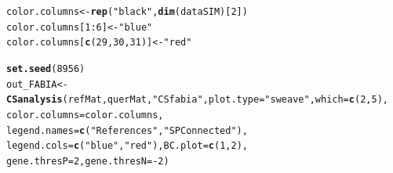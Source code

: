 \documentclass[a4paper]{article}\usepackage[]{graphicx}\usepackage[]{color}
\makeatletter
\newcommand{\hlnum}[1]{\textcolor[rgb]{0.686,0.059,0.569}{#1}}%
\newcommand{\hlstr}[1]{\textcolor[rgb]{0.192,0.494,0.8}{#1}}%
\newcommand{\hlopt}[1]{\textcolor[rgb]{0,0,0}{#1}}%
\newcommand{\hlstd}[1]{\textcolor[rgb]{0.345,0.345,0.345}{#1}}%
\newcommand{\hlkwb}[1]{\textcolor[rgb]{0.69,0.353,0.396}{#1}}%
\newcommand{\hlkwc}[1]{\textcolor[rgb]{0.333,0.667,0.333}{#1}}%
\newcommand{\hlkwd}[1]{\textcolor[rgb]{0.737,0.353,0.396}{\textbf{#1}}}%
\newenvironment{kframe}{%
 \def\at@end@of@kframe{}%
 \ifinner\ifhmode%
  \def\at@end@of@kframe{\end{minipage}}%
  \begin{minipage}{\columnwidth}%
 \fi\fi%
 \def\FrameCommand##1{\hskip\@totalleftmargin \hskip-\fboxsep
 \colorbox{shadecolor}{##1}\hskip-\fboxsep
     \hskip-\linewidth \hskip-\@totalleftmargin \hskip\columnwidth}%
 \MakeFramed {\advance\hsize-\width
   \@totalleftmargin\z@ \linewidth\hsize
   \@setminipage}}%
 {\par\unskip\endMakeFramed%
 \at@end@of@kframe}
\newenvironment{knitrout}{}{} %
\makeatother
\begin{document}
\begin{knitrout}
\color{fgcolor}\begin{kframe}
\begin{alltt}
        \hlstd{color.columns} \hlkwb{<-} \hlkwd{rep}\hlstd{(}\hlstr{"black"}\hlstd{,}\hlkwd{dim}\hlstd{(dataSIM)[}\hlnum{2}\hlstd{])}
        \hlstd{color.columns[}\hlnum{1}\hlopt{:}\hlnum{6}\hlstd{]} \hlkwb{<-} \hlstr{"blue"}
        \hlstd{color.columns[}\hlkwd{c}\hlstd{(}\hlnum{29}\hlstd{,}\hlnum{30}\hlstd{,}\hlnum{31}\hlstd{)]} \hlkwb{<-} \hlstr{"red"}

        \hlkwd{set.seed}\hlstd{(}\hlnum{8956}\hlstd{)}
        \hlstd{out_FABIA} \hlkwb{<-} \hlkwd{CSanalysis}\hlstd{(refMat,querMat,}\hlstr{"CSfabia"}\hlstd{,}\hlkwc{plot.type}\hlstd{=}\hlstr{"sweave"}\hlstd{,}\hlkwc{which}\hlstd{=}\hlkwd{c}\hlstd{(}\hlnum{2}\hlstd{,}\hlnum{5}\hlstd{),}
                        \hlkwc{color.columns}\hlstd{=color.columns,}
                        \hlkwc{legend.names}\hlstd{=}\hlkwd{c}\hlstd{(}\hlstr{"References"}\hlstd{,}\hlstr{"SP Connected"}\hlstd{),}
                        \hlkwc{legend.cols}\hlstd{=}\hlkwd{c}\hlstd{(}\hlstr{"blue"}\hlstd{,}\hlstr{"red"}\hlstd{),} \hlkwc{BC.plot}\hlstd{=}\hlkwd{c}\hlstd{(}\hlnum{1}\hlstd{,}\hlnum{2}\hlstd{),}
                        \hlkwc{gene.thresP}\hlstd{=}\hlnum{2}\hlstd{,}\hlkwc{gene.thresN}\hlstd{=}\hlopt{-}\hlnum{2}\hlstd{)}
\end{alltt}
\end{kframe}\begin{figure}[H]



\end{figure}
\end{knitrout}
\end{document}
